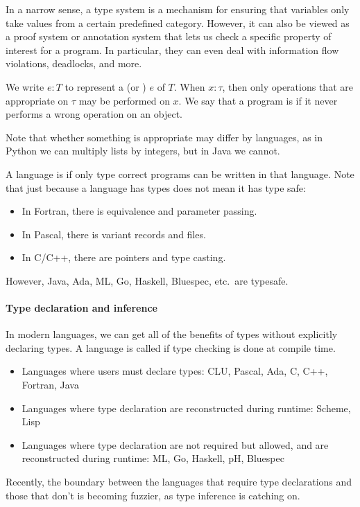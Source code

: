 \documentclass[class=scrartcl]{standalone}
\begin{document}
In a narrow sense, a type system is a mechanism for ensuring that
variables only take values from a certain predefined category.
However, it can also be viewed as a proof system or annotation system
that lets us check a specific property of interest for a program.
In particular, they can even deal with information flow violations,
deadlocks, and more.

We write \(e : T\) to represent
a  (or ) \(e\) of  \(T\).
When \(x : \tau\), then only operations that
are appropriate on \(\tau\) may be performed on \(x\).
We say that a program is  if
it never performs a wrong operation on an object.

Note that whether something is appropriate may differ by languages,
as in Python we can multiply lists by integers, but in Java we cannot.

A language is  if only type correct programs
can be written in that language.
Note that just because a language has types does not mean it has type safe:
\begin{itemize}[nosep]
  \item In Fortran, there is equivalence and parameter passing.
  \item In Pascal, there is variant records and files.
  \item In C/C++, there are pointers and type casting.
\end{itemize}
However, Java, Ada, ML, Go, Haskell, Bluespec, etc.\ are typesafe.

\paragraph{Type declaration and inference}
In modern languages, we can get all of the benefits of types without
explicitly declaring types.
A language is called  if
type checking is done at compile time.
\begin{itemize}
  \item Languages where users must declare types:
        CLU, Pascal, Ada, C, C++, Fortran, Java
  \item Languages where type declaration are reconstructed during runtime:
        Scheme, Lisp
  \item Languages where type declaration are not required but allowed,
        and are reconstructed during runtime:
        ML, Go, Haskell, pH, Bluespec
\end{itemize}
Recently, the boundary between the languages that require
type declarations and those that don't is becoming fuzzier,
as type inference is catching on.
\end{document}
